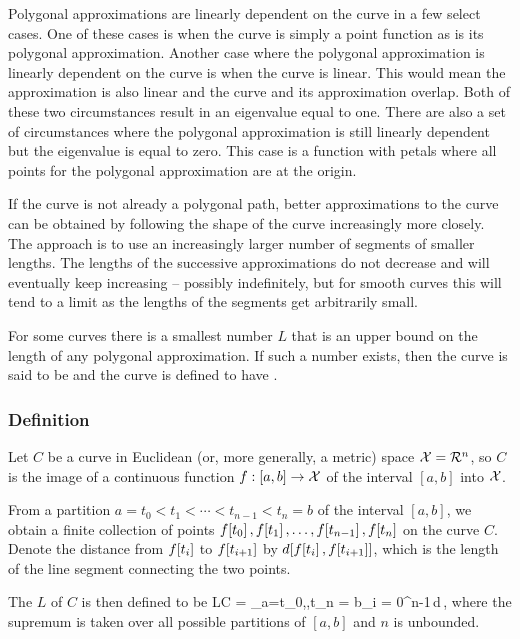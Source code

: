 Polygonal approximations are linearly dependent on the curve in a few select cases. One of these cases is when the curve is simply a point function as is its polygonal approximation. Another case where the polygonal approximation is linearly dependent on the curve is when the curve is linear. This would mean the approximation is also linear and the curve and its approximation overlap. Both of these two circumstances result in an eigenvalue equal to one. There are also a set of circumstances where the polygonal approximation is still linearly dependent but the eigenvalue is equal to zero. This case is a function with petals where all points for the polygonal approximation are at the origin.

If the curve is not already a polygonal path, better approximations to the curve can be obtained by following the shape of the curve increasingly more closely. The approach is to use an increasingly larger number of segments of smaller lengths. The lengths of the successive approximations do not decrease and will eventually keep increasing -- possibly indefinitely, but for smooth curves this will tend to a limit as the lengths of the segments get arbitrarily small.

For some curves there is a smallest number $L$ that is an upper bound on the length of any polygonal approximation. If such a number exists, then the curve is said to be  and the curve is defined to have .


\subsubsection{Definition}
Let $C$ be a curve in Euclidean (or, more generally, a metric) space $\mathcal{X} = \mathcal{R}^{n}$, so $C$ is the image of a continuous function ${f}:{[a,b]}\to{\mathcal{X}}$ of the interval $[a,b]$ into $\mathcal{X}$.

From a partition $a = t_0 < t_1 < \dotsb < t_{n-1} < t_n = b$ of the interval $[a,b]$, we obtain a finite collection of points $f\!\left[{t_0}\right],f\!\left[{t_1}\right], \dotsc, f\!\left[{t_{n-1}}\right], f\!\left[{t_n}\right]$ on the curve $C$. Denote the distance from $f\!\left[{t_i}\right]$ to $f\!\left[{t_{i+1}}\right]$ by $d\!\left[{f\!\left[{t_i}\right], f\!\left[{t_{i+1}}\right]}\right]$, which is the length of the line segment connecting the two points.

The  $L$ of $C$ is then defined to be
\beq
L\vat C = \sup_{a=t_0,\dotsc,t_n = b}\sum_{i = 0}^{n-1}\,d\,,
\eeq
where the supremum is taken over all possible partitions of $[a,b]$ and $n$ is unbounded.

